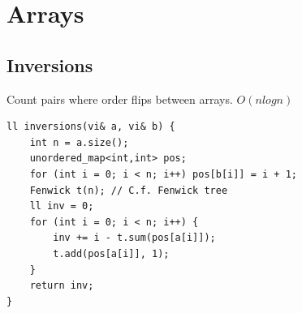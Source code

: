 \documentclass[10pt,a4paper]{article}
\begin{document}
\section{Arrays}

\subsection{Inversions}

Count pairs where order flips between arrays. $O(n log n)$
\begin{verbatim}
ll inversions(vi& a, vi& b) {
    int n = a.size();
    unordered_map<int,int> pos;
    for (int i = 0; i < n; i++) pos[b[i]] = i + 1;
    Fenwick t(n); // C.f. Fenwick tree
    ll inv = 0;
    for (int i = 0; i < n; i++) {
        inv += i - t.sum(pos[a[i]]);
        t.add(pos[a[i]], 1);
    }
    return inv;
}
\end{verbatim}
\end{document}

